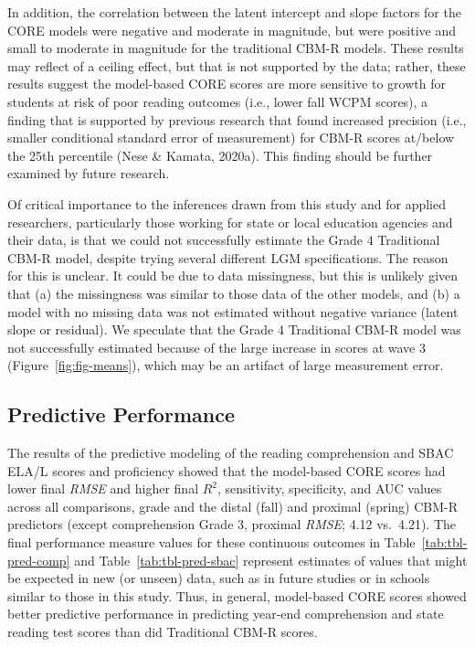 \documentclass[
  english,
  man, fleqn, noextraspace]{apa6}
\begin{document}
In addition, the correlation between the latent intercept and slope factors for the CORE models were negative and moderate in magnitude, but were positive and small to moderate in magnitude for the traditional CBM-R models. These results may reflect of a ceiling effect, but that is not supported by the data; rather, these results suggest the model-based CORE scores are more sensitive to growth for students at risk of poor reading outcomes (i.e., lower fall WCPM scores), a finding that is supported by previous research that found increased precision (i.e., smaller conditional standard error of measurement) for CBM-R scores at/below the 25th percentile (Nese \& Kamata, 2020a). This finding should be further examined by future research.

Of critical importance to the inferences drawn from this study and for applied researchers, particularly those working for state or local education agencies and their data, is that we could not successfully estimate the Grade 4 Traditional CBM-R model, despite trying several different LGM specifications. The reason for this is unclear. It could be due to data missingness, but this is unlikely given that (a) the missingness was similar to those data of the other models, and (b) a model with no missing data was not estimated without negative variance (latent slope or residual). We speculate that the Grade 4 Traditional CBM-R model was not successfully estimated because of the large increase in scores at wave 3 (Figure~\ref{fig:fig-means}), which may be an artifact of large measurement error.

\hypertarget{predictive-performance}{%
\subsection{Predictive Performance}\label{predictive-performance}}

The results of the predictive modeling of the reading comprehension and SBAC ELA/L scores and proficiency showed that the model-based CORE scores had lower final \emph{RMSE} and higher final \(R^2\), sensitivity, specificity, and AUC values across all comparisons, grade and the distal (fall) and proximal (spring) CBM-R predictors (except comprehension Grade 3, proximal \emph{RMSE}; 4.12 vs.~4.21). The final performance measure values for these continuous outcomes in Table~\ref{tab:tbl-pred-comp} and Table~\ref{tab:tbl-pred-sbac} represent estimates of values that might be expected in new (or unseen) data, such as in future studies or in schools similar to those in this study. Thus, in general, model-based CORE scores showed better predictive performance in predicting year-end comprehension and state reading test scores than did Traditional CBM-R scores.
\end{document}
